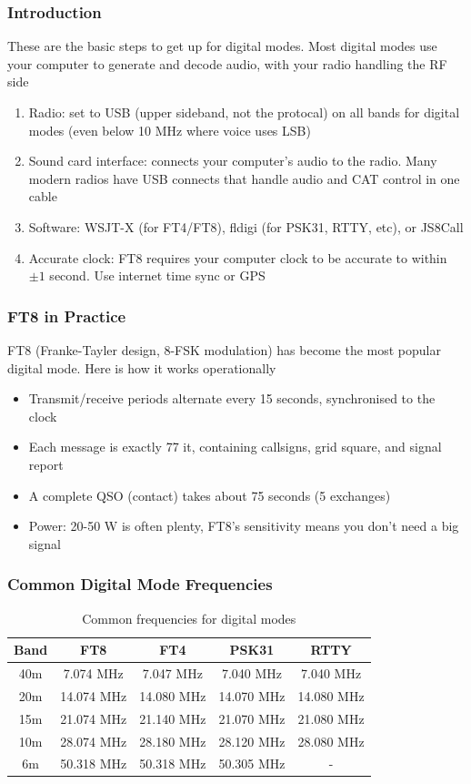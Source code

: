 \documentclass{article}
\begin{document}
\subsubsection{Introduction}
These are the basic steps to get up for digital modes. Most digital modes use your computer to generate and decode audio, with your radio handling the RF side
\begin{enumerate}
    \item Radio: set to USB (upper sideband, not the protocal) on all bands for digital modes (even below 10 MHz where voice uses LSB)
    \item Sound card interface: connects your computer's audio to the radio. Many modern radios have USB connects that handle audio and CAT control in one cable
    \item Software: WSJT-X (for FT4/FT8), fldigi (for PSK31, RTTY, etc), or JS8Call
    \item Accurate clock: FT8 requires your computer clock to be accurate to within $\pm 1$ second. Use internet time sync or GPS
\end{enumerate}

\subsubsection{FT8 in Practice}
FT8 (Franke-Tayler design, 8-FSK modulation) has become the most popular digital mode. Here is how it works operationally
\begin{itemize}
    \item Transmit/receive periods alternate every 15 seconds, synchronised to the clock
    \item Each message is exactly 77 it, containing callsigns, grid square, and signal report
    \item A complete QSO (contact) takes about 75 seconds (5 exchanges)
    \item Power: 20-50 W is often plenty, FT8's sensitivity means you don't need a big signal
\end{itemize}

\subsubsection{Common Digital Mode Frequencies}
\begin{table}[h]
    \centering
    \caption{Common frequencies for digital modes}
    \label{tab:15}
    \begin{tabular}{c|c|c|c|c}
        Band & FT8 & FT4 & PSK31 & RTTY \\
        \hline
        \hline
        40m & 7.074 MHz &  7.047 MHz & 7.040 MHz & 7.040 MHz \\
        20m & 14.074 MHz & 14.080 MHz & 14.070 MHz & 14.080 MHz \\
        15m & 21.074 MHz & 21.140 MHz & 21.070 MHz & 21.080 MHz \\
        10m & 28.074 MHz & 28.180 MHz & 28.120 MHz & 28.080 MHz \\
        6m & 50.318 MHz & 50.318 MHz & 50.305 MHz & -
    \end{tabular}
\end{table}
\end{document}

